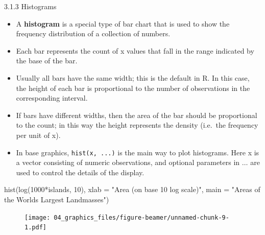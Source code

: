 \documentclass[
  9pt,
  a4paper,
  ignorenonframetext,
  notheorems]{beamer}
\newenvironment{Shaded}{\begin{snugshade}}{\end{snugshade}}
\newcommand{\AttributeTok}[1]{\textcolor[rgb]{0.40,0.45,0.13}{#1}}
\newcommand{\DecValTok}[1]{\textcolor[rgb]{0.68,0.00,0.00}{#1}}
\newcommand{\FunctionTok}[1]{\textcolor[rgb]{0.28,0.35,0.67}{#1}}
\newcommand{\NormalTok}[1]{\textcolor[rgb]{0.00,0.23,0.31}{#1}}
\newcommand{\SpecialCharTok}[1]{\textcolor[rgb]{0.37,0.37,0.37}{#1}}
\newcommand{\StringTok}[1]{\textcolor[rgb]{0.13,0.47,0.30}{#1}}
\begin{document}
\begin{frame}[fragile]{3.1.3 Histograms}
\protect\hypertarget{histograms}{}
\begin{itemize}
\item
  A \textbf{histogram} is a special type of bar chart that is used to
  show the frequency distribution of a collection of numbers.
\item
  Each bar represents the count of x values that fall in the range
  indicated by the base of the bar.
\item
  Usually all bars have the same width; this is the default in R. In
  this case, the height of each bar is proportional to the number of
  observations in the corresponding interval.
\item
  If bars have different widths, then the area of the bar should be
  proportional to the count; in this way the height represents the
  density (i.e.~the frequency per unit of x).
\item
  In base graphics, \texttt{hist(x,\ ...)} is the main way to plot
  histograms. Here x is a vector consisting of numeric observations, and
  optional parameters in \(\ldots\) are used to control the details of
  the display.
\end{itemize}
\end{frame}

\begin{frame}[fragile]
\begin{Shaded}
\begin{Highlighting}[]
\FunctionTok{hist}\NormalTok{(}\FunctionTok{log}\NormalTok{(}\DecValTok{1000}\SpecialCharTok{*}\NormalTok{islands, }\DecValTok{10}\NormalTok{), }\AttributeTok{xlab =} \StringTok{"Area (on base 10 log scale)"}\NormalTok{, }
     \AttributeTok{main =} \StringTok{"Areas of the World\textquotesingle{}s Largest Landmasses"}\NormalTok{)}
\end{Highlighting}
\end{Shaded}

\begin{figure}

{\centering \texttt{[image: 04\_graphics\_files/figure-beamer/unnamed-chunk-9-1.pdf]}

}

\end{figure}
\end{frame}
\end{document}
